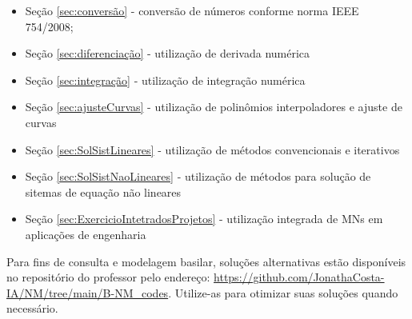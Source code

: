 \documentclass[12pt]{elsarticle}
\begin{document}
\begin{itemize}
	\item Seção \ref{sec:conversão} - conversão de números conforme norma IEEE 754/2008;
	\item Seção \ref{sec:diferenciação} - utilização de derivada numérica
	\item Seção \ref{sec:integração} - utilização de integração numérica 
	\item Seção \ref{sec:ajusteCurvas} - utilização de polinômios interpoladores e ajuste  de curvas
	\item Seção \ref{sec:SolSistLineares} - utilização de métodos convencionais e iterativos
	\item Seção \ref{sec:SolSistNaoLineares} - utilização de métodos para solução de sitemas de equação não lineares
	\item Seção \ref{sec:ExercicioIntetradosProjetos} - utilização integrada de MNs em aplicações de engenharia

\end{itemize}
Para fins de consulta e modelagem basilar, soluções alternativas estão disponíveis no repositório do professor pelo endereço: 
\url{https://github.com/JonathaCosta-IA/NM/tree/main/B-NM_codes}. Utilize-as para otimizar suas soluções quando necessário.




\renewcommand{\bibsection}{\section*{REFER\^ENCIAS BIBLIOGR\'AFICAS}}


\end{document}
